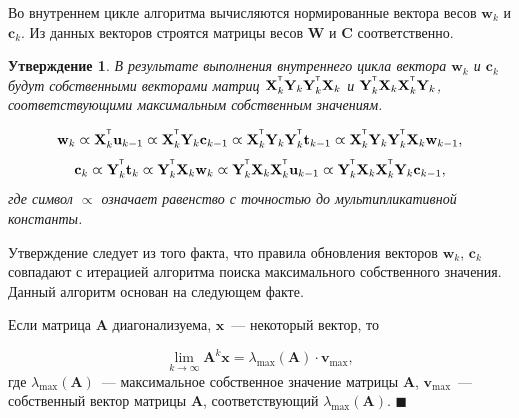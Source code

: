 \documentclass[12pt,twoside]{article}
\newtheorem{statement}{Утверждение}
\newcommand{\bx}{\mathbf{x}}
\newcommand{\bw}{\mathbf{w}}
\newcommand{\bY}{\mathbf{Y}}
\newcommand{\bX}{\mathbf{X}}
\newcommand{\bu}{\mathbf{u}}
\newcommand{\bt}{\mathbf{t}}
\newcommand{\bc}{\mathbf{c}}
\newcommand{\bC}{\mathbf{C}}
\newcommand{\bW}{\mathbf{W}}
\newcommand{\T}{^{\text{\tiny\sffamily\upshape\mdseries T}}}
\begin{document}
Во внутреннем цикле алгоритма вычисляются нормированные вектора весов $\bw_k$ и $\bc_k$. Из данных векторов строятся матрицы весов $\bW$ и $\bC$ соответственно.

\begin{statement}
	В результате выполнения внутреннего цикла вектора $\bw_k$ и $\bc_k$ будут собственными векторами матриц $\bX_k^{\T} \bY_k \bY_k^{\T} \bX_k$ и $\bY_k^{\T} \bX_k \bX_k^{\T} \bY_k$, соответствующими максимальным собственным значениям.
	
	\begin{equation*}
	\bw_k \varpropto \bX_k^{\T} \bu_{k-1} \varpropto \bX_k^{\T} \bY_k \bc_{k-1} \varpropto \bX_k^{\T} \bY_k \bY_k^{\T} \bt_{k-1} \varpropto \bX_k^{\T} \bY_k \bY_k^{\T} \bX_k \bw_{k-1},
	\end{equation*}
	\begin{equation*}
	\bc_k \varpropto \bY_k^{\T} \bt_k \varpropto \bY_k^{\T} \bX_k \bw_k \varpropto \bY_k^{\T} \bX_k \bX_k^{\T} \bu_{k-1} \varpropto \bY_k^{\T} \bX_k \bX_k^{\T} \bY_k \bc_{k-1},
	\end{equation*}
	где символ $\varpropto$ означает равенство с точностью до мультипликативной константы. 
	\label{st::eig}
\end{statement}

Утверждение следует из того факта, что правила обновления векторов $\bw_k$, $\bc_k$ совпадают с итерацией алгоритма поиска максимального собственного значения. Данный алгоритм основан на следующем факте.

Если матрица $\mathbf{A}$ диагонализуема, $\bx$~--- некоторый вектор, то

\[
	\lim_{k \rightarrow \infty} \mathbf{A}^k \bx = \lambda_{\max}(\mathbf{A}) \cdot \mathbf{v}_{\max},
\]
где $ \lambda_{\max} (\mathbf{A})$~--- максимальное собственное значение матрицы $\mathbf{A}$, $\mathbf{v}_{\max}$~---собственный вектор матрицы $\mathbf{A}$, соответствующий $ \lambda_{\max} (\mathbf{A})$.
$\blacksquare$
\end{document}
